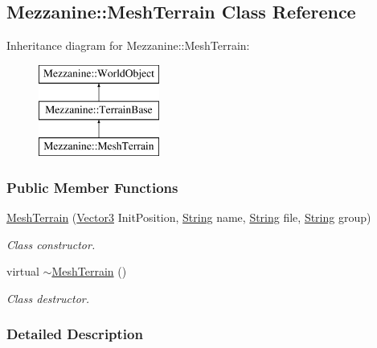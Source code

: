 \hypertarget{classMezzanine_1_1MeshTerrain}{
\subsection{Mezzanine::MeshTerrain Class Reference}
\label{classMezzanine_1_1MeshTerrain}
}
Inheritance diagram for Mezzanine::MeshTerrain:\begin{figure}[H]
\begin{center}
\leavevmode
\includegraphics[height=3.000000cm]{classMezzanine_1_1MeshTerrain}
\end{center}
\end{figure}
\subsubsection*{Public Member Functions}
\begin{DoxyCompactItemize}
\item 
\hyperlink{classMezzanine_1_1MeshTerrain_ad5feb8d622354e82b3e2d4a211e50e8d}{MeshTerrain} (\hyperlink{classMezzanine_1_1Vector3}{Vector3} InitPosition, \hyperlink{namespaceMezzanine_acf9fcc130e6ebf08e3d8491aebcf1c86}{String} name, \hyperlink{namespaceMezzanine_acf9fcc130e6ebf08e3d8491aebcf1c86}{String} file, \hyperlink{namespaceMezzanine_acf9fcc130e6ebf08e3d8491aebcf1c86}{String} group)
\begin{DoxyCompactList}\small\item\em Class constructor. \item\end{DoxyCompactList}\item 
virtual \hyperlink{classMezzanine_1_1MeshTerrain_a792dcf3ac8dfeb254a79243481921aff}{$\sim$MeshTerrain} ()
\begin{DoxyCompactList}\small\item\em Class destructor. \item\end{DoxyCompactList}\end{DoxyCompactItemize}


\subsubsection{Detailed Description}


